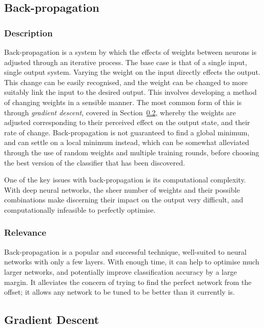 \subsection{Back-propagation}\label{lit:back_prop}
\subsubsection{Description}
Back-propagation is a system by which the effects of weights between neurons is adjusted through an iterative process. The base case is that of a single input, single output system. 
Varying the weight on the input directly effects the output. This change can be easily recognised, and the weight can be changed to more suitably link the input to the desired output. This involves developing a method of changing weights in a sensible manner. The most common form of this is through \textit{gradient descent}, covered in Section~\ref{lit:grad_desc}, whereby the weights are adjusted corresponding to their perceived effect on the output state, and their rate of change. Back-propagation is not guaranteed to find a global minimum, and can settle on a local minimum instead, which can be somewhat alleviated through the use of random weights and multiple training rounds, before choosing the best version of the classifier that has been discovered. 


One of the key issues with back-propagation is its computational complexity. With deep neural networks, the sheer number of weights and their possible combinations make discerning their impact on the output very difficult, and computationally infeasible to perfectly optimise.

\subsubsection{Relevance}
Back-propagation is a popular and successful technique, well-suited to neural networks with only a few layers. With enough time, it can help to optimise much larger networks, and potentially improve classification accuracy by a large margin. It alleviates the concern of trying to find the perfect network from the offset; it allows any network to be tuned to be better than it currently is.

\subsection{Gradient Descent}\label{lit:grad_desc}
